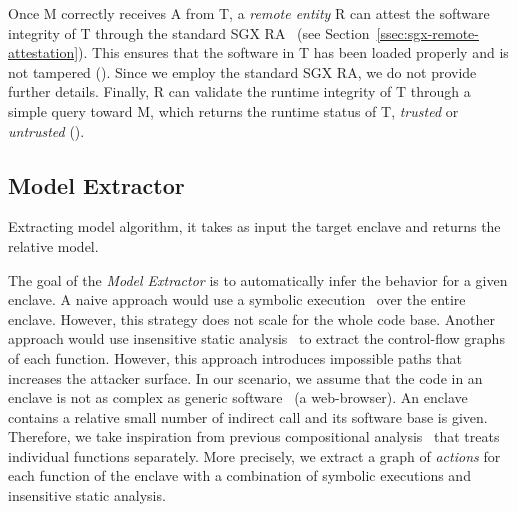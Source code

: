 Once M correctly receives A from T, a \emph{remote entity} R can attest the 
software integrity of T through the standard SGX RA~\citep{anati2013innovative} 
(see Section~\ref{ssec:sgx-remote-attestation}). This ensures that the software 
in T has been loaded properly and is not tampered  (\circled[5]).
Since we employ the standard SGX RA, we do not provide further details.
Finally, R can validate the runtime integrity of T through a simple query 
toward M, which returns the runtime status of T, \ie \emph{trusted} or 
\emph{untrusted} (\circled[6]).


\subsection{Model Extractor}
\label{sec:model-exctraction}

\begin{algorithm}[t]
	\SetAlgoLined
	\DontPrintSemicolon
	\caption{Extracting model algorithm, it takes as input the target enclave 
		and returns the relative model.}
	\label{alg:model-extractor}
\end{algorithm}

The goal of the \emph{Model Extractor} is to automatically infer the 
behavior for a given enclave. A naive approach would use a symbolic 
execution~\citep{king1976symbolic} over the entire enclave.
However, this strategy does not scale for the whole code base.
Another approach would use insensitive static 
analysis~\citep{coppa2017rethinking} to extract the control-flow graphs of each 
function. However, this approach introduces impossible paths that increases the 
attacker surface.
In our scenario, we assume that the code in an enclave is not as 
complex as generic software~\citep{abadi2009control} (\eg a web-browser).
An enclave contains a relative small number of indirect call and its 
software base is given.
Therefore, we take inspiration from previous compositional 
analysis~\citep{calcagno2009compositional} that treats individual functions 
separately.
More precisely, we extract a graph of \emph{actions} for each function of the 
enclave with a combination of symbolic executions and insensitive static 
analysis.

